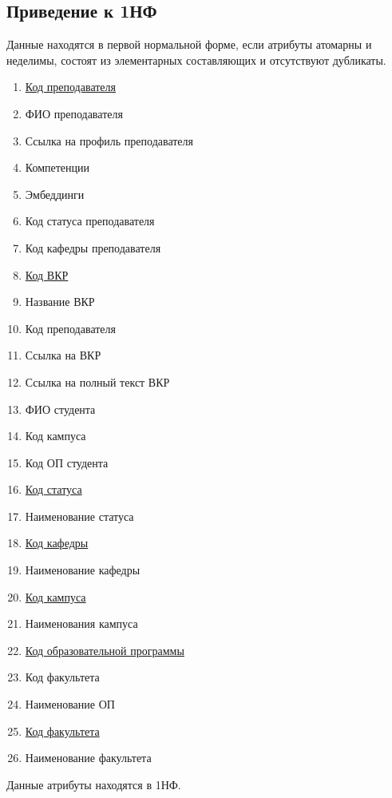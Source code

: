 \documentclass[PI,KR]{HSEUniversity}
\begin{document}
\subsection{Приведение к 1НФ}
Данные находятся в первой нормальной форме, если атрибуты атомарны и неделимы, состоят из элементарных составляющих и отсутствуют дубликаты.
\begin{enumerate}
	\item \underline{Код преподавателя}
	\item ФИО преподавателя
	\item Ссылка на профиль преподавателя
	\item Компетенции
	\item Эмбеддинги
	\item Код статуса преподавателя
	\item Код кафедры преподавателя
		
	\item \underline{Код ВКР}
	\item Название ВКР
	\item Код преподавателя
	\item Ссылка на ВКР
	\item Ссылка на полный текст ВКР
	\item ФИО студента
	\item Код кампуса
	\item Код ОП студента
	
	\item \underline{Код статуса}
	\item Наименование статуса
	
	\item \underline{Код кафедры}
	\item Наименование кафедры
	
	\item \underline{Код кампуса}
	\item Наименования кампуса
	
	\item \underline{Код образовательной программы}
	\item Код факультета
	\item Наименование ОП
	
	\item \underline{Код факультета}
	\item Наименование факультета
\end{enumerate} 

Данные атрибуты находятся в 1НФ.
\end{document}
